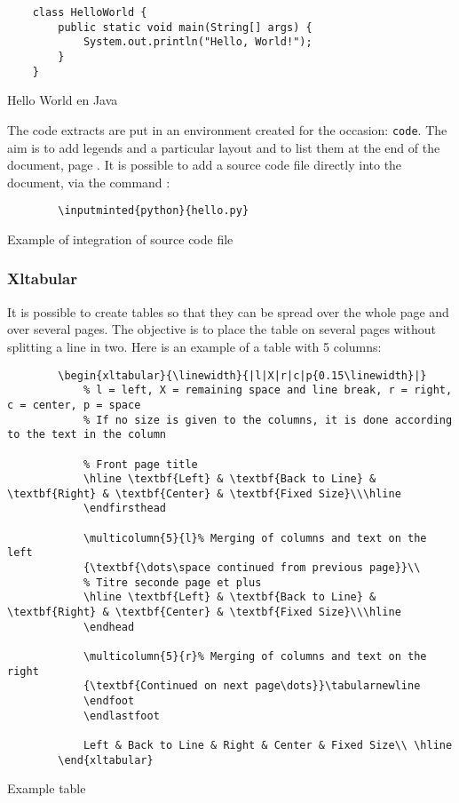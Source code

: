 \begin{code}
    \begin{verbatim}
    class HelloWorld {
        public static void main(String[] args) {
            System.out.println("Hello, World!");
        }
    }
\end{verbatim}
    \caption{Hello World en Java}
\end{code}

The code extracts are put in an environment created for the occasion: \verb=code=.
The aim is to add legends and a particular layout and to list them at the end of the document,
page \pageref{TableOfCode}.
It is possible to add a source code file directly into the document, via the command :
\begin{code}
    \begin{verbatim}
        \inputminted{python}{hello.py}
\end{verbatim}
    \caption{Example of integration of source code file}
\end{code}

\subsubsection{Xltabular}
It is possible to create tables so that they can be spread over the whole page and over several pages.
The objective is to place the table on several pages without splitting a line in two.
Here is an example of a table with 5 columns:
\begin{code}
    \begin{verbatim}
        \begin{xltabular}{\linewidth}{|l|X|r|c|p{0.15\linewidth}|}
            % l = left, X = remaining space and line break, r = right, c = center, p = space
            % If no size is given to the columns, it is done according to the text in the column

            % Front page title
            \hline \textbf{Left} & \textbf{Back to Line} & \textbf{Right} & \textbf{Center} & \textbf{Fixed Size}\\\hline
            \endfirsthead

            \multicolumn{5}{l}% Merging of columns and text on the left
            {\textbf{\dots\space continued from previous page}}\\
            % Titre seconde page et plus
            \hline \textbf{Left} & \textbf{Back to Line} & \textbf{Right} & \textbf{Center} & \textbf{Fixed Size}\\\hline
            \endhead

            \multicolumn{5}{r}% Merging of columns and text on the right
            {\textbf{Continued on next page\dots}}\tabularnewline
            \endfoot
            \endlastfoot

            Left & Back to Line & Right & Center & Fixed Size\\ \hline
        \end{xltabular}
\end{verbatim}
    \caption{Example table}
\end{code}

